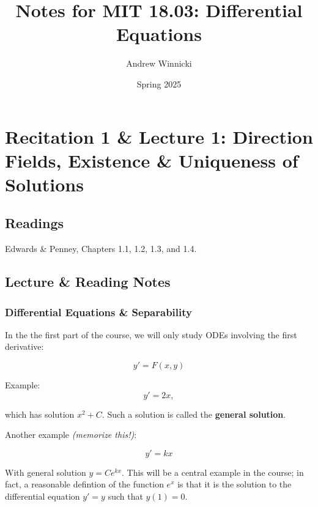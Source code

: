 \documentclass{article}
\begin{document}
\title{Notes for MIT 18.03: Differential Equations}
\author{Andrew Winnicki}
\date{Spring 2025}
\maketitle

\section{Recitation 1 \& Lecture 1: Direction Fields, Existence \& Uniqueness of Solutions}

\subsection{Readings}

Edwards \& Penney, Chapters 1.1, 1.2, 1.3, and 1.4.

\subsection{Lecture \& Reading Notes}

\subsubsection{Differential Equations \& Separability}

In the the first part of the course, we will only study ODEs involving the first derivative:

\begin{equation}
  \label{eq:firstorderode}
  y' = F(x, y)
\end{equation}

Example:
\begin{equation}
  y' = 2x,
\end{equation}

which has solution $x^2 + C$. Such a solution is called the \textbf{general solution}.

Another example \textit{(memorize this!)}:

\begin{equation}
  \label{eq:naturalgrowth}
  y' = kx
\end{equation}

With general solution $y = Ce^{kx}$. This will be a central example in the course; in fact, a reasonable defintion of the function $e^x$ is that it is the solution to the differential equation $y' = y$ such that $y(1) = 0$.
\end{document}
